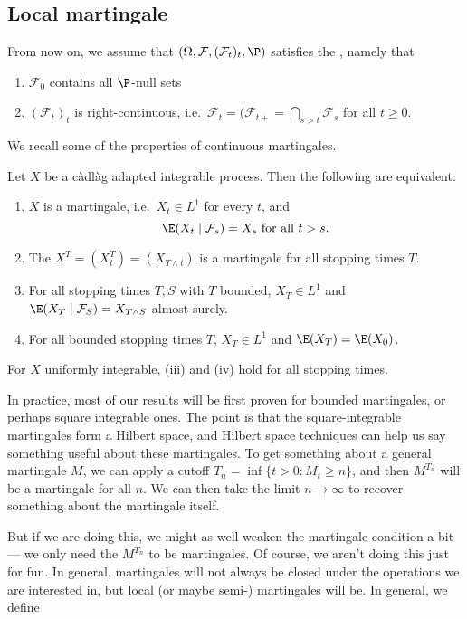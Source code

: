 \documentclass[a4paper]{article}
\begin{document}
\subsection{Local martingale}
From now on, we assume that $(\Omega, \mathcal{F}, (\mathcal{F}_t)_t, \P)$ satisfies the , namely that
\begin{enumerate}
  \item $\mathcal{F}_0$ contains all $\P$-null sets
  \item $(\mathcal{F}_t)_t$ is right-continuous, i.e.\ $\mathcal{F}_t = (\mathcal{F}_{t+} = \bigcap_{s > t} \mathcal{F}_s$ for all $t \geq 0$.
\end{enumerate}

We recall some of the properties of continuous martingales.
\begin{thm}
  Let $X$ be a c\`adl\`ag adapted integrable process. Then the following are equivalent:
  \begin{enumerate}
    \item $X$ is a martingale, i.e.\ $X_t \in L^1$ for every $t$, and
      \[
        \E(X_t \mid \mathcal{F}_s) = X_s \text{ for all }t > s.
      \]
    \item The  $X^T = (X^T_t) = (X_{T \wedge t})$ is a martingale for all stopping times $T$.
    \item For all stopping times $T, S$ with $T$ bounded, $X_T \in L^1$ and $\E(X_T \mid \mathcal{F}_S) = X_{T \wedge S}$ almost surely.
    \item For all bounded stopping times $T$, $X_T \in L^1$ and $\E(X_T) = \E(X_0)$.
  \end{enumerate}
  For $X$ uniformly integrable, (iii) and (iv) hold for all stopping times.
\end{thm}

In practice, most of our results will be first proven for bounded martingales, or perhaps square integrable ones. The point is that the square-integrable martingales form a Hilbert space, and Hilbert space techniques can help us say something useful about these martingales. To get something about a general martingale $M$, we can apply a cutoff $T_n = \inf \{t > 0: M_t \geq n\}$, and then $M^{T_n}$ will be a martingale for all $n$. We can then take the limit $n \to \infty$ to recover something about the martingale itself.

But if we are doing this, we might as well weaken the martingale condition a bit --- we only need the $M^{T_n}$ to be martingales. Of course, we aren't doing this just for fun. In general, martingales will not always be closed under the operations we are interested in, but local (or maybe semi-) martingales will be.  In general, we define
\end{document}
